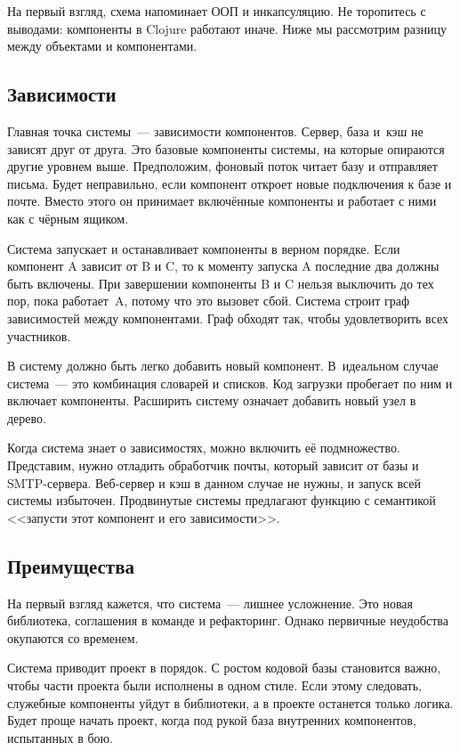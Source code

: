 На первый взгляд, схема напоминает ООП и инкапсуляцию. Не торопитесь с выводами:
компоненты в Clojure работают иначе. Ниже мы рассмотрим разницу между объектами
и компонентами.

\subsection{Зависимости}

Главная точка системы~--- зависимости компонентов. Сервер, база и~кэш не зависят
друг от друга. Это базовые компоненты системы, на которые опираются другие
уровнем выше. Предположим, фоновый поток читает базу и отправляет письма. Будет
неправильно, если компонент откроет новые подключения к базе и почте. Вместо
этого он принимает включённые компоненты и работает с ними как с чёрным ящиком.

Система запускает и останавливает компоненты в верном порядке. Если компонент A
зависит от B и C, то к моменту запуска A последние два должны быть включены. При
завершении компоненты B и C нельзя выключить до тех пор, пока работает~A, потому
что это вызовет сбой. Система строит граф зависимостей между компонентами. Граф
обходят так, чтобы удовлетворить всех участников.

В систему должно быть легко добавить новый компонент. В~идеальном случае
система~--- это комбинация словарей и списков. Код загрузки пробегает по ним и
включает компоненты. Расширить систему означает добавить новый узел в дерево.

Когда система знает о зависимостях, можно включить её подмножество. Представим,
нужно отладить обработчик почты, который зависит от базы и
SMTP-сервера. Веб-сервер и кэш в данном случае не нужны, и запуск всей системы
избыточен. Продвинутые системы предлагают функцию с семантикой <<запусти этот
компонент и его зависимости>>.

\subsection{Преимущества}

На первый взгляд кажется, что система~--- лишнее усложнение. Это новая
библиотека, соглашения в команде и рефакторинг. Однако первичные неудобства
окупаются со временем.

Система приводит проект в порядок. С ростом кодовой базы становится важно, чтобы
части проекта были исполнены в одном стиле. Если этому следовать, служебные
компоненты уйдут в библиотеки, а в проекте останется только логика. Будет проще
начать проект, когда под рукой база внутренних компонентов, испытанных в бою.

